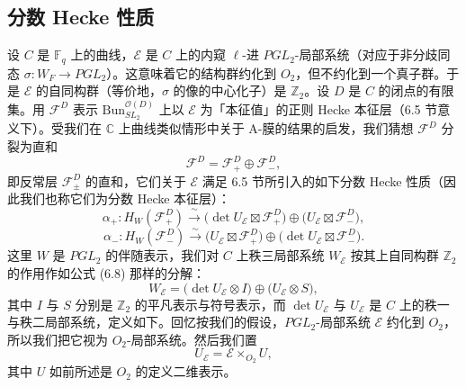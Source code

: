 \documentclass[11pt,a4paper]{article}
\newcommand{\Bun}{\mathrm{Bun}}
\begin{document}
\subsection{分数 Hecke 性质}

设 $C$ 是 $\mathbb{F}_q$ 上的曲线，$\mathcal{E}$ 是 $C$ 上的内窥 $\ell$-进 $PGL_2$-局部系统（对应于非分歧同态 $\sigma : W_F \to PGL_2$）。这意味着它的结构群约化到 $O_2$，但不约化到一个真子群。于是 $\mathcal{E}$ 的自同构群（等价地，$\sigma$ 的像的中心化子）是 $\mathbb{Z}_2$。设 $D$ 是 $C$ 的闭点的有限集。用 $\mathcal{F}^D$ 表示 $\Bun^{\mathcal{O}(D)}_{SL_2}$ 上以 $\mathcal{E}$ 为「本征值」的正则 Hecke 本征层（6.5 节意义下）。受我们在 $\mathbb{C}$ 上曲线类似情形中关于 A-膜的结果的启发，我们猜想 $\mathcal{F}^D$ 分裂为直和
\begin{equation}\tag{8.6}
\mathcal{F}^D = \mathcal{F}^D_+ \oplus \mathcal{F}^D_-,
\end{equation}
即反常层 $\mathcal{F}^D_\pm$ 的直和，它们关于 $\mathcal{E}$ 满足 6.5 节所引入的如下分数 Hecke 性质（因此我们也称它们为分数 Hecke 本征层）：
\begin{equation}\tag{8.7}
\alpha_+ : H_W(\mathcal{F}^D_+) \xrightarrow{\ \sim\ } \bigl(\det U_{\mathcal{E}}\boxtimes \mathcal{F}^D_+\bigr)\oplus \bigl(U_{\mathcal{E}}\boxtimes \mathcal{F}^D_-\bigr),
\end{equation}
\begin{equation}\tag{8.8}
\alpha_- : H_W(\mathcal{F}^D_-) \xrightarrow{\ \sim\ } \bigl(U_{\mathcal{E}}\boxtimes \mathcal{F}^D_+\bigr)\oplus \bigl(\det U_{\mathcal{E}}\boxtimes \mathcal{F}^D_-\bigr).
\end{equation}
这里 $W$ 是 $PGL_2$ 的伴随表示，我们对 $C$ 上秩三局部系统 $W_{\mathcal{E}}$ 按其上自同构群 $\mathbb{Z}_2$ 的作用作如公式 (6.8) 那样的分解：
\begin{equation}\tag{8.9}
W_{\mathcal{E}} = \bigl(\det U_{\mathcal{E}}\otimes I\bigr)\oplus \bigl(U_{\mathcal{E}}\otimes S\bigr),
\end{equation}
其中 $I$ 与 $S$ 分别是 $\mathbb{Z}_2$ 的平凡表示与符号表示，而 $\det U_{\mathcal{E}}$ 与 $U_{\mathcal{E}}$ 是 $C$ 上的秩一与秩二局部系统，定义如下。回忆按我们的假设，$PGL_2$-局部系统 $\mathcal{E}$ 约化到 $O_2$，所以我们把它视为 $O_2$-局部系统。然后我们置
\[
U_{\mathcal{E}} = \mathcal{E}\times_{O_2} U,
\]
其中 $U$ 如前所述是 $O_2$ 的定义二维表示。

\end{document}
